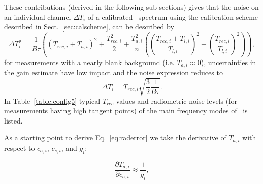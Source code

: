 These contributions (derived in the following sub-sections) gives that the noise on an individual channel \(\Delta T_{i}\) of a 
calibrated \smr\ spectrum using the calibration scheme described in Sect.~\ref{sec:calscheme}, 
can be described by
\begin{equation}
\Delta T_{i}^{2} =  \frac{1}{B\tau} \left( (T_{rec,i}+T_{a,i})^2 + \frac{T_{rec,i}^2}{2} +
   \frac{T_{a,i}^{2}}{n} \left( \left( \frac{T_{rec,i} + T_{l,i}}{T_{l,i}} \right)^2 + 
   \left( \frac{T_{rec,i} }{T_{l,i}} \right)^2 \right) \right),
\label{eq:raderror}
\end{equation}
for measurements with a nearly blank background (i.e. \(T_{a,i}\approx\)0), uncertainties in the gain estimate 
have low impact and the noise expression reduces to
\begin{equation}
\Delta T_{i} =  T_{rec,i}\sqrt{\frac{3}{2}\frac{1}{B\tau}}.
\label{eq:higaltnoise}
\end{equation}
In Table~\ref{table:config5} typical \(T_{rec}\) values and radiometric noise levels
(for measurements having high tangent points)
of the main frequency modes of \smr\ is listed.



As a starting point to derive Eq.~\ref{eq:raderror} we take the derivative of \(T_{a,i}\) 
with respect to \(c_{a,i}\), \(c_{s,i}\), and \(g_{i}\):

\begin{equation}
\frac{\partial T_{a,i}}{\partial c_{a,i}} \approx \frac{1}{g_i}, 
\end{equation}

